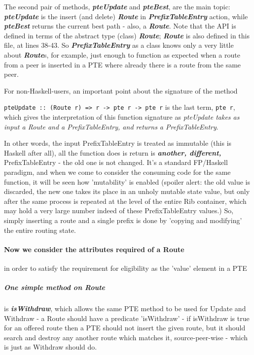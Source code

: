 The second pair of methods, \textbf{\textit{pteUpdate}} and \textbf{\textit{pteBest}}, are the main topic: \textbf{\textit{pteUpdate}} is the insert (and delete) \textbf{\textit{Route}} in \textbf{\textit{PrefixTableEntry}} action, while \textbf{\textit{pteBest}} returns the current best path - also, a \textbf{\textit{Route}}.
Note that the API is defined in terms of the abstract type (class) \textbf{\textit{Route}};  \textbf{\textit{Route}} is also defined in this file, at lines 38-43.  So \textbf{\textit{PrefixTableEntry}} as a class knows only a very little about \textbf{\textit{Route}}s, for example,  just enough to function as expected when a route from a peer is inserted in a PTE where already there is a route from the same peer.

\smallskip

For non-Haskell-users, an important point about the signature of the method

\lstinline|pteUpdate :: (Route r) => r -> pte r -> pte r| is the last term, \lstinline|pte r|, which gives the interpretation of this function signature as \textit{pteUpdate takes as input a Route and a PrefixTableEntry, and returns a PrefixTableEntry}.

In other words, the input PrefixTableEntry is treated as immutable (this is Haskell after all), all the function does is return is \textbf{\textit{another, different,}} PrefixTableEntry - the old one is not changed.  It's a standard FP/Haskell paradigm, and when we come to consider the consuming code for the same function, it will be seen how 'mutability' is enabled (spoiler alert: the old value is discarded, the new one takes its place in an unholy mutable state value, but only after the same process is repeated at the level of the entire Rib container, which may hold a very large number indeed of these PrefixTableEntry values.)  So, simply inserting a route and a single prefix is done by 'copying and modifying' the entire routing state.
\bigskip

\paragraph{Now we consider the attributes required of a Route} in order to satisfy the requirement for eligibility as the 'value' element in a  PTE


\subparagraph{One simple method on Route} is
\textit{\textbf{isWithdraw}}, which allows the same PTE method to be used for Update and Withdraw - a Route should have a predicate 'isWithdraw' - if isWithdraw is true for an offered route then a PTE should not insert the given route, but it should search and destroy any another route which matches it, source-peer-wise - which is just as Withdraw should do. 
  
